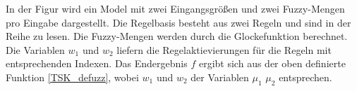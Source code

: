 In der Figur wird ein Model mit zwei Eingangsgrößen und zwei Fuzzy-Mengen pro Eingabe dargestellt. Die Regelbasis besteht aus zwei Regeln und sind in der Reihe zu lesen. Die Fuzzy-Mengen werden durch die Glockefunktion berechnet. Die Variablen $w_1$ und $w_2$ liefern die Regelaktievierungen für die Regeln mit entsprechenden Indexen. Das Endergebnis $f$ ergibt sich aus der oben definierte Funktion \ref{TSK_defuzz}, wobei $w_1$ und $w_2$ der Variablen $\mu_1$ $\mu_2$ entsprechen.


%
